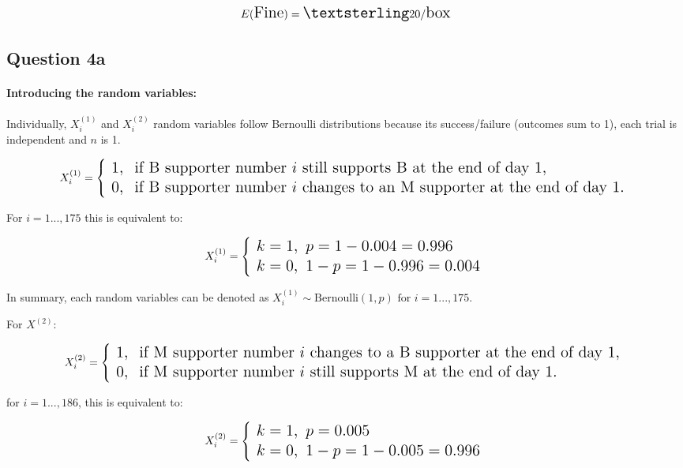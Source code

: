 \documentclass[
]{article}
\begin{document}
\[
\Large
E(\text{Fine}) =  £20/\text{box}
\]

\hfill\break
\hfill\break
\hfill\break
\hfill\break

\subsection{Question 4a}\label{question-4a}

\paragraph{Introducing the random
variables:}\label{introducing-the-random-variables}

Individually, \(X_i^{(1)}\) and \(X_i^{(2)}\) random variables follow
Bernoulli distributions because its success/failure (outcomes sum to 1),
each trial is independent and \(n\) is 1.

\[
\Large
X_i^{(1)} = \left\{
\begin{array}{ll}
1, & \text{if B supporter number } i \text{ still supports B at the end of day 1}, \\
0, & \text{if B supporter number } i \text{ changes to an M supporter at the end of day 1}.
\end{array}
\right.
\]

For \(i =1...,175\) this is equivalent to:

\[
\Large
X_i^{(1)} = \left\{
\begin{array}{ll}
k= 1, \text{ }p = 1- 0.004 = 0.996 \\
k= 0, \text{ }1-p = 1- 0.996 = 0.004
\end{array}
\right.
\]

In summary, each random variables can be denoted as
\(X_i^{(1)} \sim \text{Bernoulli}(1,p)\text{ for } i = 1...,175\).

\hfill\break

For \(X^{(2)}\):

\[
\Large
X_i^{(2)} = \left\{
\begin{array}{ll}
1, & \text{if M supporter number } i \text{ changes to a B supporter at the end of day 1}, \\
0, & \text{if M supporter number } i \text{ still supports M at the end of day 1}.
\end{array}
\right.
\]

for \(i =1...,186\), this is equivalent to:

\[
\Large
X_i^{(2)} = \left\{
\begin{array}{ll}
k=1, \text{ }p = 0.005 \\
k=0, \text{ }1-p = 1- 0.005 = 0.996
\end{array}
\right.
\]
\end{document}
